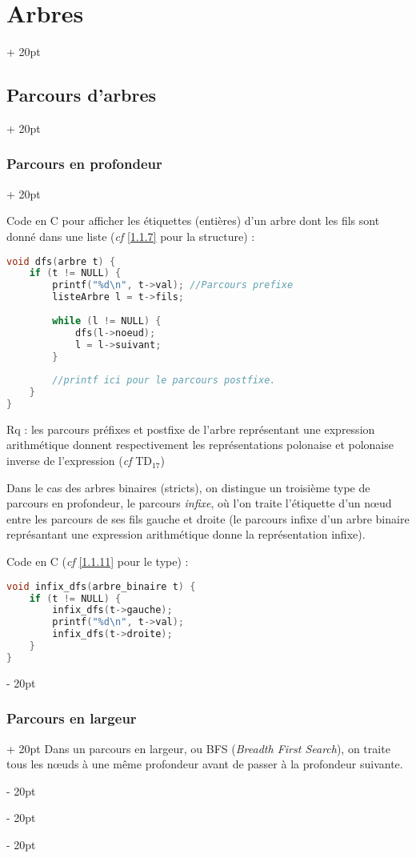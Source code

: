 \documentclass[a4paper, 12pt, twoside]{article}
\newcommand{\ind}[1][20pt]{\advance\leftskip + #1}
\newcommand{\deind}[1][20pt]{\advance\leftskip - #1}
\newenvironment{indt}[2][20pt]{#2 \par \ind[#1]}{\par \deind} %
\begin{document}
\begin{indt}{\section{Arbres}}
\begin{indt}{\subsection{Parcours d'arbres}}
\begin{indt}{\subsubsection{Parcours en profondeur}}
                \vspace{12pt}
                
                Code en C pour afficher les étiquettes (entières) d'un arbre dont les fils sont donné dans une liste (\textit{cf} \ref{1.1.7} pour la structure) :
                
                \begin{lstlisting}[language=C, xleftmargin=80pt]
void dfs(arbre t) {
    if (t != NULL) {
        printf("%d\n", t->val); //Parcours prefixe
        listeArbre l = t->fils;
        
        while (l != NULL) {
            dfs(l->noeud);
            l = l->suivant;
        }
        
        //printf ici pour le parcours postfixe.
    }
}\end{lstlisting}
                
                \vspace{6pt}
                
                Rq : les parcours préfixes et postfixe de l'arbre représentant une expression arithmétique donnent respectivement les représentations polonaise et polonaise inverse de l'expression (\textit{cf} TD$_{17}$)
                
                Dans le cas des arbres binaires (stricts), on distingue un troisième type de parcours en profondeur, le parcours \textit{infixe}, où l'on traite l'étiquette d'un n\oe ud entre les parcours de ses fils gauche et droite (le parcours infixe d'un arbre binaire représantant une expression arithmétique donne la représentation infixe).
                
                Code en C (\textit{cf} \ref{1.1.11} pour le type) :
                
                \begin{lstlisting}[language=C, xleftmargin=80pt]
void infix_dfs(arbre_binaire t) {
    if (t != NULL) {
        infix_dfs(t->gauche);
        printf("%d\n", t->val);
        infix_dfs(t->droite);
    }
}\end{lstlisting}
            \end{indt}
            
            \vspace{12pt}
            
            \begin{indt}{\subsubsection{Parcours en largeur}}
                Dans un parcours en largeur, ou BFS (\textit{Breadth First Search}), on traite tous les n\oe uds à une même profondeur avant de passer à la profondeur suivante.
                

\end{indt}
\end{indt}
\end{indt}
\end{document}
